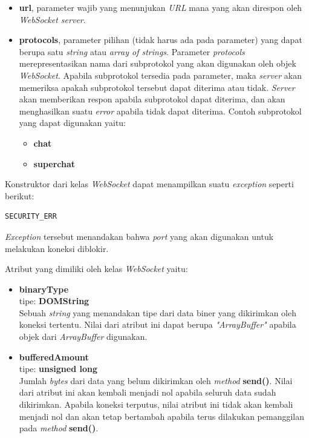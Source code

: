 \documentclass[a4paper,twoside]{article}
\begin{document}
\begin{enumerate}
\begin{enumerate}
			\begin{itemize}
				\item \textbf{url}, parameter wajib yang menunjukan \textit{URL} mana yang akan direspon oleh \textit{WebSocket server}.
				
				\item \textbf{protocols}, parameter pilihan (tidak harus ada pada parameter) yang dapat berupa satu \textit{string} atau \textit{array of strings}. Parameter \textit{protocols} merepresentasikan nama dari subprotokol yang akan digunakan oleh objek \textit{WebSocket}. Apabila subprotokol tersedia pada parameter, maka \textit{server} akan memeriksa apakah subprotokol tersebut dapat diterima atau tidak. \textit{Server} akan memberikan respon apabila subprotokol dapat diterima, dan akan menghasilkan suatu \textit{error} apabila tidak dapat diterima. Contoh subprotokol yang dapat digunakan yaitu:
				\begin{itemize}
					\item \textbf{chat}
					\item \textbf{superchat}
				\end{itemize}
				
			\end{itemize}
			
			Konstruktor dari kelas \textit{WebSocket} dapat menampilkan suatu \textit{exception} seperti berikut:
			
\begin{lstlisting}
SECURITY_ERR
\end{lstlisting}
			
			\textit{Exception} tersebut menandakan bahwa \textit{port} yang akan digunakan untuk melakukan koneksi diblokir.
			
			Atribut yang dimiliki oleh kelas \textit{WebSocket} yaitu:
			
			\begin{itemize}
				\item \textbf{binaryType} \\ tipe: \textbf{DOMString} \\ Sebuah \textit{string} yang menandakan tipe dari data biner yang dikirimkan oleh koneksi tertentu. Nilai dari atribut ini dapat berupa \textit{"ArrayBuffer"} apabila objek dari \textit{ArrayBuffer} digunakan.
				
				\item \textbf{bufferedAmount} \\ tipe: \textbf{unsigned long} \\ Jumlah \textit{bytes} dari data yang belum dikirimkan oleh \textit{method} \textbf{send()}. Nilai dari atribut ini akan kembali menjadi nol apabila seluruh data sudah dikirimkan. Apabila koneksi terputus, nilai atribut ini tidak akan kembali menjadi nol dan akan tetap bertambah apabila terus dilakukan pemanggilan pada \textit{method} \textbf{send()}.
				

\end{itemize}
\end{enumerate}
\end{enumerate}
\end{document}
